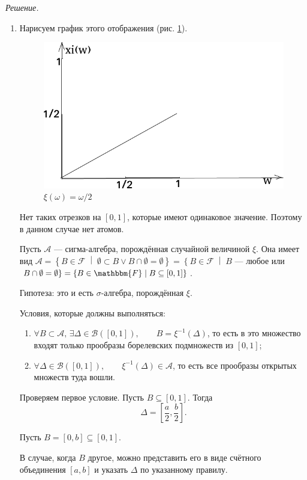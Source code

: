 \textit{Решение.}
\begin{enumerate}[label=\alph*)]
\item Нарисуем график этого отображения (рис. \ref{fig:818}).

\begin{figure}[h!]
  \centering
  \includegraphics[width=.4\textwidth]{./pictures/8_18.png}
  \caption{$ \xi \left( \omega \right) = \omega/2$}
  \label{fig:818}
\end{figure}

Нет таких отрезков на $ \left[ 0, 1 \right] $, которые имеют одинаковое значение.
Поэтому в данном случае нет атомов.

Пусть $ \mathcal{A} $ --- сигма-алгебра, порождённая случайной величиной $ \xi $.
Она имеет вид
$ \mathcal{A} =
\left\{ B \in \mathcal{F} \; \middle| \; \emptyset \subset B \vee B \cap \emptyset = \emptyset \right\} =
\left\{ B \in \mathcal{F} \; \middle| \; B \right.$ --- любое или $ \left. B \cap \emptyset = \emptyset \right\} =
\left\{ B \in \mathbbm{F} \; \middle| \; B \subseteq \left[ 0, 1 \right] \right\} $.

Гипотеза: это и есть $ \sigma $-алгебра, порождённая $ \xi $.

Условия, которые должны выполняться:
\begin{enumerate}
\item $ \forall B \subset \mathcal{A}, \, \exists \Delta \in \mathcal{B} \left( \left[ 0, 1 \right] \right), \qquad B = \xi^{-1} \left( \Delta \right) $, то есть в это множество входят только прообразы борелевских подмножеств из $ \left[ 0, 1 \right] $;
\item $ \forall \Delta \in \mathcal{B} \left( \left[ 0, 1 \right] \right), \qquad \xi^{-1} \left( \Delta \right) \in \mathcal{A} $,
то есть все прообразы открытых множеств туда вошли.
\end{enumerate}

Проверяем первое условие.
Пусть $B \subseteq \left[ 0, 1 \right] $.
Тогда
$$ \Delta =
\left[ \frac{a}{2}, \frac{b}{2} \right].$$

Пусть $B = \left[ 0, b \right] \subseteq \left[ 0, 1 \right] $.

В случае, когда $B$ другое, можно представить его в виде счётного объединения $ \left[ a, b \right] $ и указать $ \Delta $ по указанному правилу.


\end{enumerate}
